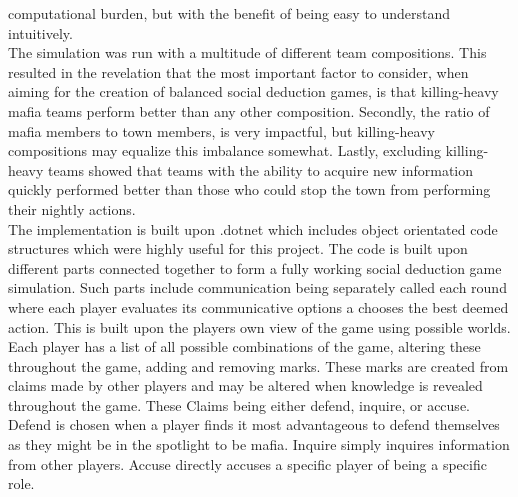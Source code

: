 computational burden, but with the benefit of being easy to understand
intuitively. \\
The simulation was run with a multitude of different team compositions. This
resulted in the revelation that the most important factor to consider, when
aiming for the creation of balanced social deduction games, is that killing-heavy mafia teams perform better than any other composition. Secondly, the ratio of mafia members to town members, is very impactful, but killing-heavy compositions may equalize this imbalance somewhat. Lastly, excluding killing-heavy teams showed that teams with the ability to acquire new information quickly performed better than those who could stop the town from performing their nightly actions.\\
The implementation is built upon .dotnet which includes object orientated code
structures which were highly useful for this project. The code is built upon
different parts connected together to form a fully working social deduction game simulation.
Such parts include communication being separately called each round where each player
evaluates its communicative options a chooses the best deemed action.
This is built upon the players own view of the game using possible
worlds. Each player has a list of all possible combinations of the game, altering these throughout the game, adding and removing marks. These marks are
created from claims made by other players and may be altered when knowledge is revealed
throughout the game. These Claims being either defend, inquire, or accuse. Defend is chosen when a player finds it most advantageous to defend themselves as they might
be in the spotlight to be mafia. Inquire simply inquires information from other
players. Accuse directly accuses a specific player of being a
specific role.
\twocolumn
